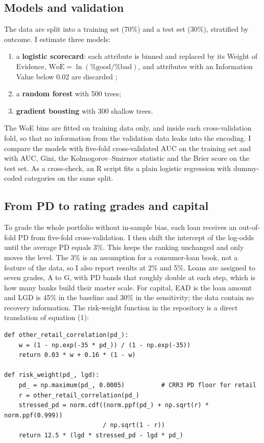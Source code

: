 \documentclass[11pt,a4paper]{article}
\begin{document}
\subsection{Models and validation}
The data are split into a training set (70\%) and a test set (30\%), stratified by outcome. I estimate three models:

\begin{enumerate}[leftmargin=1.5em,itemsep=2pt]
\item a \textbf{logistic scorecard}: each attribute is binned and replaced by its Weight of Evidence, $\text{WoE}=\ln(\%\text{good}/\%\text{bad})$, and attributes with an Information Value below 0.02 are discarded \citep{siddiqi2006};
\item a \textbf{random forest} with 500 trees;
\item \textbf{gradient boosting} with 300 shallow trees.
\end{enumerate}

The WoE bins are fitted on training data only, and inside each cross-validation fold, so that no information from the validation data leaks into the encoding. I compare the models with five-fold cross-validated AUC on the training set and with AUC, Gini, the Kolmogorov--Smirnov statistic and the Brier score on the test set. As a cross-check, an R script fits a plain logistic regression with dummy-coded categories on the same split.

\subsection{From PD to rating grades and capital}
To grade the whole portfolio without in-sample bias, each loan receives an out-of-fold PD from five-fold cross-validation. I then shift the intercept of the log-odds until the average PD equals 3\%. This keeps the ranking unchanged and only moves the level. The 3\% is an assumption for a consumer-loan book, not a feature of the data, so I also report results at 2\% and 5\%. Loans are assigned to seven grades, A to G, with PD bands that roughly double at each step, which is how many banks build their master scale. For capital, EAD is the loan amount and LGD is 45\% in the baseline and 30\% in the sensitivity; the data contain no recovery information. The risk-weight function in the repository is a direct translation of equation (1):

\begin{lstlisting}
def other_retail_correlation(pd_):
    w = (1 - np.exp(-35 * pd_)) / (1 - np.exp(-35))
    return 0.03 * w + 0.16 * (1 - w)

def risk_weight(pd_, lgd):
    pd_ = np.maximum(pd_, 0.0005)          # CRR3 PD floor for retail
    r = other_retail_correlation(pd_)
    stressed_pd = norm.cdf((norm.ppf(pd_) + np.sqrt(r) * norm.ppf(0.999))
                           / np.sqrt(1 - r))
    return 12.5 * (lgd * stressed_pd - lgd * pd_)
\end{lstlisting}
\end{document}
